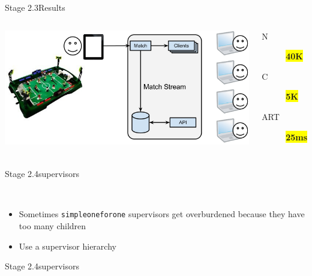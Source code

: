 \documentclass[utf8]{beamer}
\begin{document}
\begin{frame}{Stage 2.3}{Results}
	\begin{columns}
			\includegraphics[top=-1,width=\textwidth]{img/results-1.png}
			\begin{description}
				\item[N] \textbf{\colorbox{yellow}{\Large 40K}}
				\item[C] \textbf{\colorbox{yellow}{\Large 5K}}
				\item[ART] \textbf{\colorbox{yellow}{\Large 25ms}}
			\end{description}
	\end{columns}
\end{frame}
\begin{frame}{Stage 2.4}{supervisors}
	\begin{description}
		\item<+->[Simple One for One Supervisors]\ \\
			\begin{itemize}
				\item Sometimes \texttt{simple\textunderscore one\textunderscore for\textunderscore one} supervisors get \alert{overburdened} because they have too many children
				\item Use a supervisor hierarchy
			\end{itemize}
	\end{description}
\end{frame}
\begin{frame}{Stage 2.4}{supervisors}
\end{frame}
\end{document}
